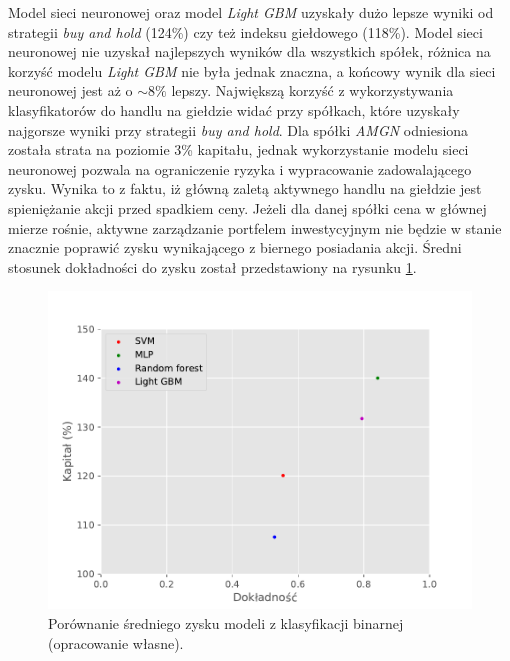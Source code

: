\documentclass[a4paper, twoside, 11pt, openright]{article}
\begin{document}
Model sieci neuronowej oraz model \textit{Light GBM} uzyskały dużo lepsze wyniki od strategii \textit{buy and hold} (124\%) czy też indeksu giełdowego (118\%). Model sieci neuronowej nie uzyskał najlepszych wyników dla wszystkich spółek, różnica na korzyść modelu \textit{Light GBM} nie była jednak znaczna, a końcowy wynik dla sieci neuronowej jest aż o $\sim 8\%$ lepszy. Największą korzyść z wykorzystywania klasyfikatorów do handlu na giełdzie widać przy spółkach, które uzyskały najgorsze wyniki przy strategii \textit{buy and hold}. Dla spółki \textit{AMGN} odniesiona została strata na poziomie 3\% kapitału, jednak wykorzystanie modelu sieci neuronowej pozwala na ograniczenie ryzyka i wypracowanie zadowalającego zysku. Wynika to z faktu, iż główną zaletą aktywnego handlu na giełdzie jest spieniężanie akcji przed spadkiem ceny. Jeżeli dla danej spółki cena w głównej mierze rośnie, aktywne zarządzanie portfelem inwestycyjnym nie będzie w stanie znacznie poprawić zysku wynikającego z biernego posiadania akcji. Średni stosunek dokładności do zysku został przedstawiony na rysunku \ref{img:summary-binary-gain}. 

\begin{figure}[H]
\centering \includegraphics[scale=0.9]{img/summary-binary-gain-summary.pdf}
\caption{Porównanie średniego zysku modeli z klasyfikacji binarnej (opracowanie własne).}
\label{img:summary-binary-gain}
\end{figure}
\end{document}

